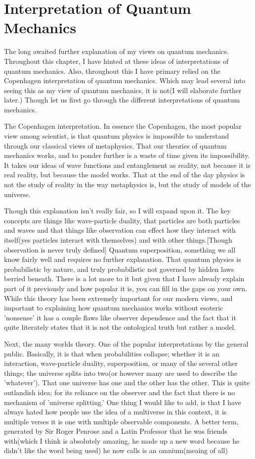 \section{Interpretation of Quantum Mechanics}
\par The long awaited further explanation of my views on quantum mechanics. Throughout this chapter, I have hinted at these ideas of interpretations of quantum mechanics. Also, throughout this I have primary relied on the Copenhagen interpretation of quantum mechanics. Which may lead several into seeing this as my view of quantum mechanics, it is not(I will elaborate further later.) Though let us first go through the different interpretations of quantum mechanics.
\par The Copenhagen interpretation. In essence the Copenhagen, the most popular view among scientist, is  that quantum physics is impossible to understand through our classical views of metaphysics. That our theories of quantum mechanics works, and to ponder further is a waste of time given its impossibility. It takes our ideas of wave functions and entanglement as reality, not because it is real reality, but because the model works. That at the end of the day physics is not the study of reality in the way metaphysics is, but the study of models of the universe.
\par Though this explanation isn't really fair, so I will expand upon it. The key concepts are things like wave-particle duality, that particles are both particles and waves and that things like observation can effect how they interact with itself(yes particles interact with themselves) and with other things.[Though observation is never truly defined] Quantum superposition, something we all know fairly well and requires no further explanation. That quantum physics is probabilistic by nature, and truly probabilistic not governed by hidden laws berried beneath. There is a lot more to it but given that I have already explain part of it previously and how popular it is, you can fill in the gaps on your own. While this theory has been extremely important for our modern views, and important to explaining how quantum mechanics works without esoteric 'nonsense' it has a couple flaws like observer dependence and the fact that it quite literately states that it is not the ontological truth but rather a model.
\par Next, the many worlds theory. One of the popular interpretations by the general public. Basically, it is that when probabilities collapse; whether it is an interaction, wave-particle duality, superposition, or many of the several other things; the universe splits into two(or however many are used to describe the 'whatever'). That one universe has one and the other has the other. This is quite outlandish idea; for its reliance on the observer and the fact that there is no mechanism of 'universe splitting.' One thing I would like to add, is that I have always hated how people use the idea of a multiverse in this context, it is multiple verses it is one with multiple observable components. A better term, generated by Sir Roger Penrose and a Latin Professor that he was friends with(which I think is absolutely amazing, he made up a new word because he didn't like the word being used) he now calls is an omnium(meaing of all)
